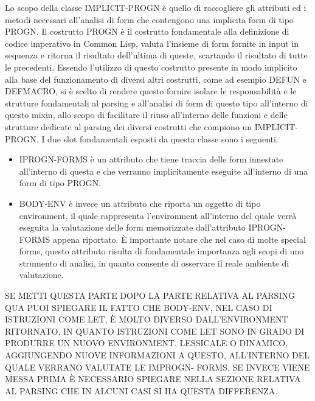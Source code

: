 Lo scopo della classe IMPLICIT-PROGN è quello di raccogliere gli attributi ed
i metodi necessari all’analisi di form che contengono una implicita form di
tipo PROGN. Il costrutto PROGN è il costrutto fondamentale alla definizione di
codice imperativo in Common Lisp, valuta l’insieme di form fornite in input in
sequenza e ritorna il risultato dell’ultima di queste, scartando il risultato
di tutte le precedenti. Essendo l’utilizzo di questo costrutto presente in
modo implicito alla base del funzionamento di diversi altri costrutti, come ad
esempio DEFUN e DEFMACRO, si è scelto di rendere questo fornire isolare le
responsabilità e le strutture fondamentali al parsing e all’analisi di form di
questo tipo all’interno di questo mixin, allo scopo di facilitare il riuso
all’interno delle funzioni e delle strutture dedicate al parsing dei diversi
costrutti che compiono un IMPLICIT-PROGN. I due slot fondamentali esposti da
questa classe sono i seguenti.\\

\begin{itemize}

\item IPROGN-FORMS è un attributo che tiene traccia delle form innestate
all’interno di questa e che verranno implicitamente eseguite all’interno di
una form di tipo PROGN.

\item BODY-ENV è invece un attributo che riporta un oggetto di tipo
environment, il quale rappresenta l’environment all’interno del quale verrà
eseguita la valutazione delle form memorizzate dall’attributo IPROGN-FORMS
appena riportato. È importante notare che nel caso di molte special forms,
questo attributo risulta di fondamentale importanza agli scopi di uno
strumento di analisi, in quanto consente di osservare il reale ambiente di
valutazione.

\end{itemize}

SE METTI QUESTA PARTE DOPO LA PARTE RELATIVA AL PARSING QUA PUOI SPIEGARE IL
FATTO CHE BODY-ENV, NEL CASO DI ISTRUZIONI COME LET, È MOLTO DIVERSO
DALL’ENVIRONMENT RITORNATO, IN QUANTO ISTRUZIONI COME LET SONO IN GRADO DI
PRODURRE UN NUOVO ENVIRONMENT, LESSICALE O DINAMICO, AGGIUNGENDO NUOVE
INFORMAZIONI A QUESTO, ALL’INTERNO DEL QUALE VERRANO VALUTATE LE IMPROGN-
FORMS. SE INVECE VIENE MESSA PRIMA È NECESSARIO SPIEGARE NELLA SEZIONE
RELATIVA AL PARSING CHE IN ALCUNI CASI SI HA QUESTA DIFFERENZA.\\

